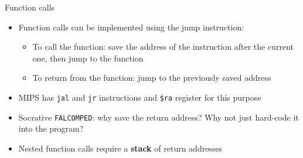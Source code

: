 \begin{frame}{Function calls}
	\begin{itemize}
		\pause\item Function calls can be implemented using the jump instruction:
			\begin{itemize}
				\pause\item To call the function: save the address of the instruction after the current one, then jump to the function
				\pause\item To return from the function: jump to the previously saved address
			\end{itemize}
		\pause\item MIPS has \lstinline{jal} and \lstinline{jr} instructions and \lstinline{$ra} register for this purpose
		\pause\item Socrative \texttt{FALCOMPED}: why save the return address? Why not just hard-code it into the program?
		\pause\item Nested function calls require a \textbf{stack} of return addresses
	\end{itemize}
\end{frame}
